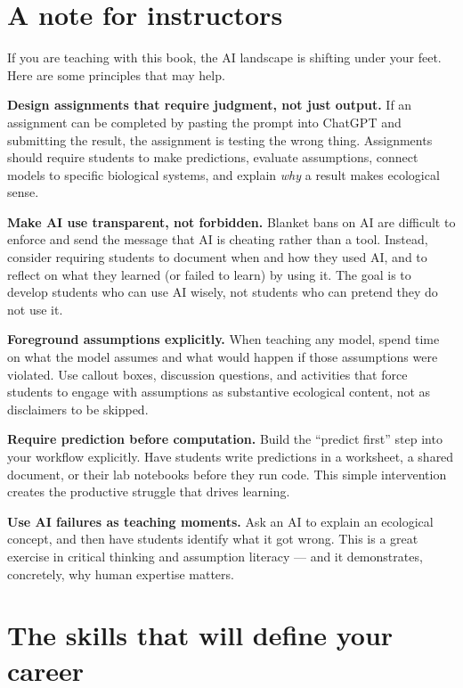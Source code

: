 \documentclass[
  letterpaper,
  DIV=11,
  numbers=noendperiod]{scrreprt}
\begin{document}
\section{A note for instructors}\label{a-note-for-instructors}

If you are teaching with this book, the AI landscape is shifting under
your feet. Here are some principles that may help.

\textbf{Design assignments that require judgment, not just output.} If
an assignment can be completed by pasting the prompt into ChatGPT and
submitting the result, the assignment is testing the wrong thing.
Assignments should require students to make predictions, evaluate
assumptions, connect models to specific biological systems, and explain
\emph{why} a result makes ecological sense.

\textbf{Make AI use transparent, not forbidden.} Blanket bans on AI are
difficult to enforce and send the message that AI is cheating rather
than a tool. Instead, consider requiring students to document when and
how they used AI, and to reflect on what they learned (or failed to
learn) by using it. The goal is to develop students who can use AI
wisely, not students who can pretend they do not use it.

\textbf{Foreground assumptions explicitly.} When teaching any model,
spend time on what the model assumes and what would happen if those
assumptions were violated. Use callout boxes, discussion questions, and
activities that force students to engage with assumptions as substantive
ecological content, not as disclaimers to be skipped.

\textbf{Require prediction before computation.} Build the ``predict
first'' step into your workflow explicitly. Have students write
predictions in a worksheet, a shared document, or their lab notebooks
before they run code. This simple intervention creates the productive
struggle that drives learning.

\textbf{Use AI failures as teaching moments.} Ask an AI to explain an
ecological concept, and then have students identify what it got wrong.
This is a great exercise in critical thinking and assumption literacy
--- and it demonstrates, concretely, why human expertise matters.

\section{The skills that will define your
career}\label{the-skills-that-will-define-your-career}
\end{document}
